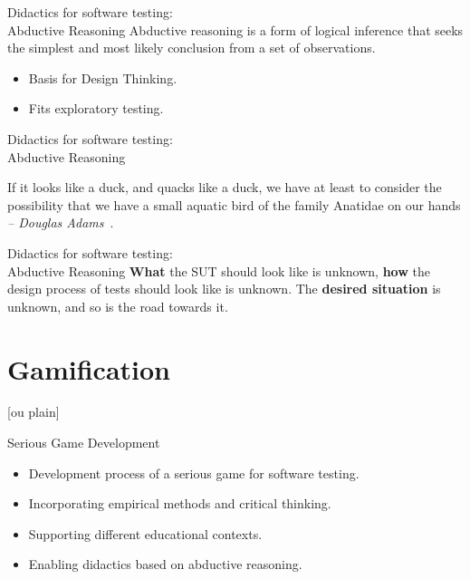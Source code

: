\documentclass[aspectratio=169]{beamer}
\begin{document}
\begin{frame}{Didactics for software testing:\\Abductive Reasoning}
    Abductive reasoning is a form of logical inference that seeks the simplest and most likely conclusion from a set of observations.~\cite{ContributorstoWikimediaprojects2024Feb} 
    \begin{itemize}
        \item Basis for Design Thinking.
        \item Fits exploratory testing.
    \end{itemize}
\end{frame}

\begin{frame}{Didactics for software testing:\\Abductive Reasoning}
    \begin{blockquote}
    If it looks like a duck, and quacks like a duck, we have at least to consider the possibility that we have a small aquatic bird of the family Anatidae on our hands\\
    \textit{-- Douglas Adams}~\cite{adams1987dirk}.
    \end{blockquote}
\end{frame}

\begin{frame}{Didactics for software testing:\\Abductive Reasoning}
    \textbf{What} the SUT should look like is unknown, \textbf{how} the design process of tests should look like is unknown. The \textbf{desired situation} is unknown, and so is the road towards it.
\end{frame}

\section{Gamification}

[ou plain]
\begin{frame}{Serious Game Development}
    \begin{itemize}
        \item Development process of a serious game for software testing.
        \item Incorporating empirical methods and critical thinking.
        \item Supporting different educational contexts.
        \item Enabling didactics based on abductive reasoning.
    \end{itemize}
\end{frame}
\end{document}
